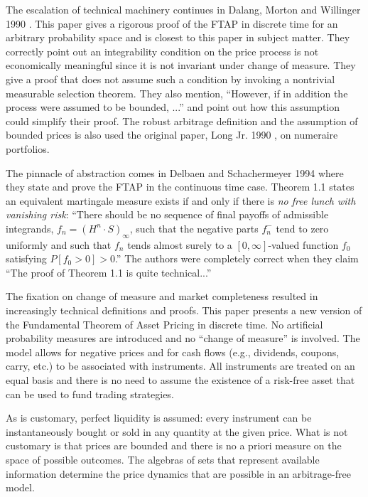 \documentclass[fleqn]{amsart}
\begin{document}
The escalation of technical machinery continues in Dalang, Morton
and Willinger 1990 \cite{DalMorWil1990}. This paper gives a rigorous
proof of the FTAP in discrete time for an arbitrary probability space
and is closest to this paper in subject matter.  They correctly point
out an integrability condition on the price process is not economically
meaningful since it is not invariant under change of measure.  They give
a proof that does not assume such a condition by invoking a nontrivial
measurable selection theorem. They also mention, ``However, if in addition
the process were assumed to be bounded, ...'' and point out how this
assumption could simplify their proof. The robust arbitrage definition
and the assumption of bounded prices is also used the original paper,
Long Jr. 1990 \cite{Lon1990},  on numeraire portfolios.

The pinnacle of abstraction comes in Delbaen and Schachermeyer 1994
\cite{DelSch1994} where they state and prove the FTAP in the continuous
time case. Theorem 1.1 states an equivalent martingale measure exists
if and only if there is {\em no free lunch with vanishing risk}: ``There
should be no sequence of final payoffs of admissible integrands, $f_n =
(H^n\cdot S)_\infty$, such that the negative parts $f_n^-$ tend to zero
uniformly and such that $f_n$ tends almost surely to a $[0,\infty]$-valued
function $f_0$ satisfying $P[f_0 > 0] > 0$.''  The authors were completely
correct when they claim ``The proof of Theorem 1.1 is quite technical...''

The fixation on change of measure and market completeness resulted in
increasingly technical definitions and proofs.  This paper presents a new
version of the Fundamental Theorem of Asset Pricing in discrete time.
No artificial probability measures are introduced and no ``change of
measure'' is involved.  The model allows for negative prices and for
cash flows (e.g., dividends, coupons, carry, etc.) to be associated with
instruments. All instruments are treated on an equal basis and there is
no need to assume the existence of a risk-free asset that can be used
to fund trading strategies.

As is customary, perfect liquidity is assumed: every instrument can
be instantaneously bought or sold in any quantity at the given price.
What is not customary is that prices are bounded and there is no a
priori measure on the space of possible outcomes. The algebras of sets
that represent available information determine the price dynamics that
are possible in an arbitrage-free model.
\end{document}
